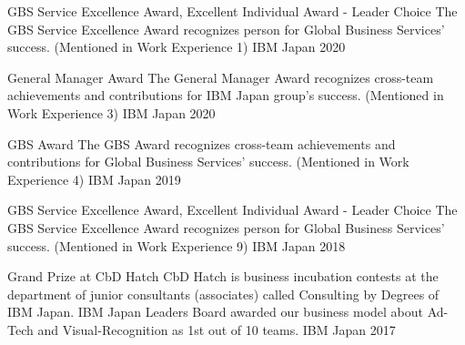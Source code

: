 



\begin{cvhonors}

  \cvhonor
    {GBS Service Excellence Award, Excellent Individual Award - Leader Choice} %
    {The GBS Service Excellence Award recognizes person for Global Business Services' success. (Mentioned in Work Experience 1)} %
    {IBM Japan} %
    {2020} %

  \cvhonor
    {General Manager Award} %
    {The General Manager Award recognizes cross-team achievements and contributions for IBM Japan group's success. (Mentioned in Work Experience 3)} %
    {IBM Japan} %
    {2020} %

  \cvhonor
    {GBS Award} %
    {The GBS Award recognizes cross-team achievements and contributions for Global Business Services' success. (Mentioned in Work Experience 4)} %
    {IBM Japan} %
    {2019} %

  \cvhonor
    {GBS Service Excellence Award, Excellent Individual Award - Leader Choice} %
    {The GBS Service Excellence Award recognizes person for Global Business Services' success. (Mentioned in Work Experience 9)} %
    {IBM Japan} %
    {2018} %

  \cvhonor
    {Grand Prize at CbD Hatch} %
    {CbD Hatch is business incubation contests at the department of junior consultants (associates) called Consulting by Degrees of IBM Japan. IBM Japan Leaders Board awarded our business model about Ad-Tech and Visual-Recognition as 1st out of 10 teams.} %
    {IBM Japan} %
    {2017} %


\end{cvhonors}


